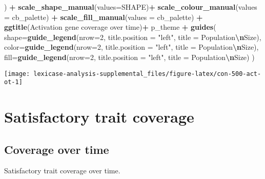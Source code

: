 \documentclass[
]{book}
\newenvironment{Shaded}{\begin{snugshade}}{\end{snugshade}}
\newcommand{\AttributeTok}[1]{\textcolor[rgb]{0.13,0.29,0.53}{#1}}
\newcommand{\DecValTok}[1]{\textcolor[rgb]{0.00,0.00,0.81}{#1}}
\newcommand{\FunctionTok}[1]{\textcolor[rgb]{0.13,0.29,0.53}{\textbf{#1}}}
\newcommand{\NormalTok}[1]{#1}
\newcommand{\SpecialCharTok}[1]{\textcolor[rgb]{0.81,0.36,0.00}{\textbf{#1}}}
\newcommand{\StringTok}[1]{\textcolor[rgb]{0.31,0.60,0.02}{#1}}
\begin{document}
\begin{Shaded}
\begin{Highlighting}[]
\NormalTok{  ) }\SpecialCharTok{+}
  \FunctionTok{scale\_shape\_manual}\NormalTok{(}\AttributeTok{values=}\NormalTok{SHAPE)}\SpecialCharTok{+}
  \FunctionTok{scale\_colour\_manual}\NormalTok{(}\AttributeTok{values =}\NormalTok{ cb\_palette) }\SpecialCharTok{+}
  \FunctionTok{scale\_fill\_manual}\NormalTok{(}\AttributeTok{values =}\NormalTok{ cb\_palette) }\SpecialCharTok{+}
  \FunctionTok{ggtitle}\NormalTok{(}\StringTok{\textquotesingle{}Activation gene coverage over time\textquotesingle{}}\NormalTok{)}\SpecialCharTok{+}
\NormalTok{  p\_theme }\SpecialCharTok{+}
  \FunctionTok{guides}\NormalTok{(}
    \AttributeTok{shape=}\FunctionTok{guide\_legend}\NormalTok{(}\AttributeTok{nrow=}\DecValTok{2}\NormalTok{, }\AttributeTok{title.position =} \StringTok{"left"}\NormalTok{, }\AttributeTok{title =} \StringTok{\textquotesingle{}Population}\SpecialCharTok{\textbackslash{}n}\StringTok{Size\textquotesingle{}}\NormalTok{),}
    \AttributeTok{color=}\FunctionTok{guide\_legend}\NormalTok{(}\AttributeTok{nrow=}\DecValTok{2}\NormalTok{, }\AttributeTok{title.position =} \StringTok{"left"}\NormalTok{, }\AttributeTok{title =} \StringTok{\textquotesingle{}Population}\SpecialCharTok{\textbackslash{}n}\StringTok{Size\textquotesingle{}}\NormalTok{),}
    \AttributeTok{fill=}\FunctionTok{guide\_legend}\NormalTok{(}\AttributeTok{nrow=}\DecValTok{2}\NormalTok{, }\AttributeTok{title.position =} \StringTok{"left"}\NormalTok{, }\AttributeTok{title =} \StringTok{\textquotesingle{}Population}\SpecialCharTok{\textbackslash{}n}\StringTok{Size\textquotesingle{}}\NormalTok{)}
\NormalTok{  )}
\end{Highlighting}
\end{Shaded}

\texttt{[image: lexicase-analysis-supplemental\_files/figure-latex/con-500-act-ot-1]}

\hypertarget{satisfactory-trait-coverage-3}{%
\section{Satisfactory trait coverage}\label{satisfactory-trait-coverage-3}}

\hypertarget{coverage-over-time-7}{%
\subsection{Coverage over time}\label{coverage-over-time-7}}

Satisfactory trait coverage over time.
\end{document}
